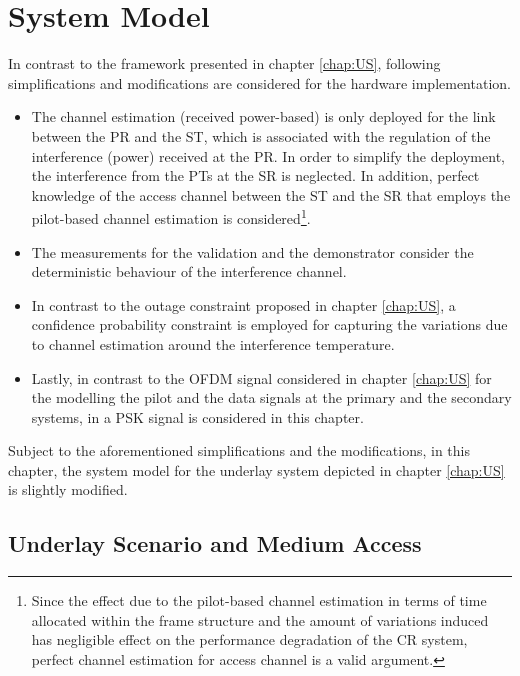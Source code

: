 \section{System Model}
\label{sysmod}
In contrast to the framework presented in chapter \ref{chap:US}, following simplifications and modifications are considered for the hardware implementation.
\begin{itemize}
\item The channel estimation (received power-based) is only deployed for the link between the PR and the ST, which is associated with the regulation of the interference (power) received at the PR. In order to simplify the deployment, the interference from the PTs at the SR is neglected. In addition, perfect knowledge of the access channel between the ST and the SR that employs the pilot-based channel estimation is considered\footnote{Since the effect due to the pilot-based channel estimation in terms of time allocated within the frame structure and the amount of variations induced has negligible effect on the performance degradation of the CR system, perfect channel estimation for access channel is a valid argument.}.  
\item The measurements for the validation and the demonstrator consider the deterministic behaviour of the interference channel.  
\item In contrast to the outage constraint proposed in chapter \ref{chap:US}, a confidence probability constraint is employed for capturing the variations due to channel estimation around the interference temperature. %
\item Lastly, in contrast to the OFDM signal considered in chapter \ref{chap:US} for the modelling the pilot and the data signals at the primary and the secondary systems, in a PSK signal is considered in this chapter. 
\end{itemize}

Subject to the aforementioned simplifications and the modifications, in this chapter, the system model for the underlay system depicted in chapter \ref{chap:US} is slightly modified. 

\subsection{Underlay Scenario and Medium Access}
\label{scenario}


